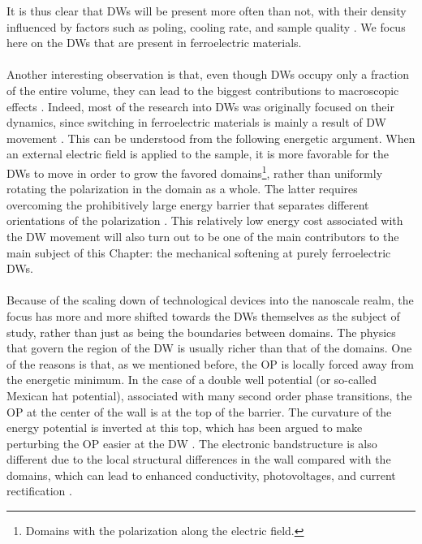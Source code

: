 It is thus clear that DWs will be present more often than not, with their density influenced by factors such as poling, cooling rate, and sample quality \cite{Griffin2012,Shen2018,Nataf2020}.
We focus here on the DWs that are present in ferroelectric materials.
\\\\
Another interesting observation is that, even though DWs occupy only a fraction of the entire volume, they can lead to the biggest contributions to macroscopic effects \cite{Schranz2012}. 
Indeed, most of the research into DWs was originally focused on their dynamics, since switching in ferroelectric materials is mainly a result of DW movement \cite{Merz1954,Gao2013}.
This can be understood from the following energetic argument.
When an external electric field is applied to the sample, it is more favorable for the DWs to move in order to grow the favored domains\footnote{Domains with the polarization along the electric field.}, rather than uniformly rotating the polarization in the domain as a whole.
The latter requires overcoming the prohibitively large energy barrier that separates different orientations of the polarization \cite{Tagantsev2010}.
This relatively low energy cost associated with the DW movement will also turn out to be one of the main contributors to the main subject of this Chapter: the mechanical softening at purely ferroelectric DWs.
\\\\
Because of the scaling down of technological devices into the nanoscale realm, the focus has more and more shifted towards the DWs themselves as the subject of study, rather than just as being the boundaries between domains.
The physics that govern the region of the DW is usually richer than that of the domains. One of the reasons is that, as we mentioned before, the OP is locally forced away from the energetic minimum.
In the case of a double well potential (or so-called Mexican hat potential), associated with many second order phase transitions, the OP at the center of the wall is at the top of the barrier.
The curvature of the energy potential is inverted at this top, which has been argued to make perturbing the OP easier at the DW \cite{Scott2012}.
The electronic bandstructure is also different due to the local structural differences in the wall compared with the domains, which can lead to enhanced conductivity, photovoltages, and current rectification \cite{Inoue2015,Korbel2018,Korbel2020,Huyan2019}.

